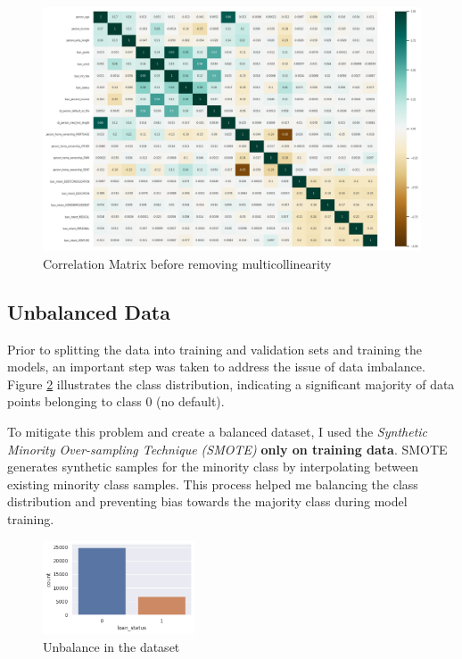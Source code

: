 \documentclass{article}
\begin{document}
\begin{figure}[h!]
    \centering
    \includegraphics[width=\textwidth]{correlation.png}
    \caption{Correlation Matrix before removing multicollinearity}
    \label{fig:corr}
\end{figure}

\subsection{Unbalanced Data}\label{subsec:unbalanced-data}
Prior to splitting the data into training and validation sets and training the models, an important step was taken to address the issue of data imbalance. Figure \ref{fig:unbalance} illustrates the class distribution, indicating a significant majority of data points belonging to class 0 (no default).

To mitigate this problem and create a balanced dataset, I used the \emph{Synthetic Minority Over-sampling Technique (SMOTE)} \textbf{only on training data}. SMOTE generates synthetic samples for the minority class by interpolating between existing minority class samples. This process helped me balancing the class distribution and preventing bias towards the majority class during model training.

\begin{figure}[h!]
    \centering
    \includegraphics[width=0.4\textwidth]{unbalance.png}
    \caption{Unbalance in the dataset}
    \label{fig:unbalance}
\end{figure}
\end{document}
